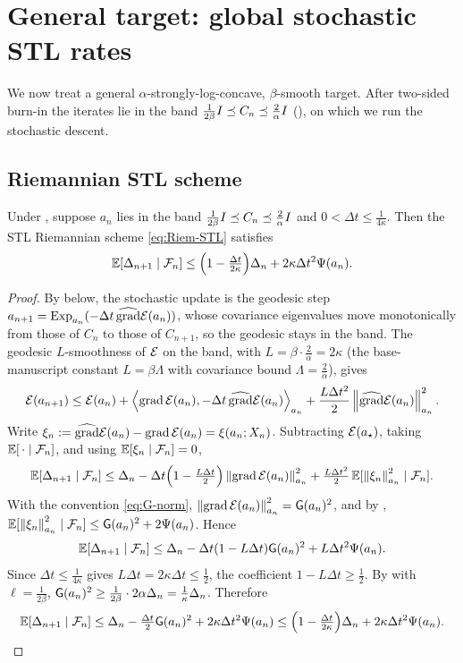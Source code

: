 \section{General target: global stochastic STL rates}

We now treat a general $\alpha$-strongly-log-concave, $\beta$-smooth target. After two-sided
burn-in the iterates lie in the band $\tfrac1{2\beta}I\preceq C_n\preceq\tfrac2\alpha I$
(), on which we run the stochastic descent.

\subsection{Riemannian STL scheme}

\begin{lemma}
\label{lem:Riem-STL-descent}
Under , suppose $a_n$ lies in the band
$\tfrac1{2\beta}I\preceq C_n\preceq\tfrac2\alpha I$ and
$0<\Delta t\leq\frac1{4\kappa}$.
Then the STL Riemannian scheme \eqref{eq:Riem-STL} satisfies
\[
    \mathbb{E}[\Delta_{n+1}\mid\mathcal{F}_n]
    \leq
    \Bigl(1-\tfrac{\Delta t}{2\kappa}\Bigr)\Delta_n
    +
    2\kappa\Delta t^2\Psi(a_n).
\]
\end{lemma}

\begin{proof}
By  below, the stochastic update is the geodesic step
$a_{n+1}=\operatorname{Exp}_{a_n}(-\Delta t\,\widehat{\operatorname{grad}}\mathcal{E}(a_n))$,
whose covariance eigenvalues move monotonically from those of $C_n$ to those of
$C_{n+1}$, so the geodesic stays in the band. The geodesic $L$-smoothness
of $\mathcal{E}$ on the band, with $L=\beta\cdot\tfrac2\alpha=2\kappa$ (the base-manuscript
constant $L=\beta\Lambda$ with covariance bound $\Lambda=\tfrac2\alpha$), gives
\[
    \mathcal{E}(a_{n+1})
    \leq
    \mathcal{E}(a_n)
    +
    \left\langle \operatorname{grad}\mathcal{E}(a_n),-\Delta t\,\widehat{\operatorname{grad}}\mathcal{E}(a_n)\right\rangle_{a_n}
    +
    \frac{L\Delta t^2}{2}\left\lVert \widehat{\operatorname{grad}}\mathcal{E}(a_n)\right\rVert_{a_n}^2 .
\]
Write $\xi_n:=\widehat{\operatorname{grad}}\mathcal{E}(a_n)-\operatorname{grad}\mathcal{E}(a_n)=\xi(a_n;X_n)$. Subtracting
$\mathcal{E}(a_\star)$, taking $\mathbb{E}[\,\cdot\mid\mathcal{F}_n]$, and using $\mathbb{E}[\xi_n\mid\mathcal{F}_n]=0$,
\[
    \mathbb{E}[\Delta_{n+1}\mid\mathcal{F}_n]
    \leq
    \Delta_n
    -
    \Delta t\Bigl(1-\tfrac{L\Delta t}2\Bigr)\left\lVert \operatorname{grad}\mathcal{E}(a_n)\right\rVert_{a_n}^2
    +
    \tfrac{L\Delta t^2}2\,\mathbb{E}[\left\lVert \xi_n\right\rVert_{a_n}^2\mid\mathcal{F}_n].
\]
With the convention \eqref{eq:G-norm}, $\left\lVert \operatorname{grad}\mathcal{E}(a_n)\right\rVert_{a_n}^2=\mathsf{G}(a_n)^2$,
and by , $\mathbb{E}[\left\lVert \xi_n\right\rVert_{a_n}^2\mid\mathcal{F}_n]\leq\mathsf{G}(a_n)^2+2\Psi(a_n)$.
Hence
\[
    \mathbb{E}[\Delta_{n+1}\mid\mathcal{F}_n]
    \leq
    \Delta_n
    -
    \Delta t(1-L\Delta t)\mathsf{G}(a_n)^2
    +
    L\Delta t^2\Psi(a_n).
\]
Since $\Delta t\leq\tfrac1{4\kappa}$ gives $L\Delta t=2\kappa\Delta t\leq\tfrac12$, the coefficient
$1-L\Delta t\geq\tfrac12$. By  with $\ell=\tfrac1{2\beta}$,
$\mathsf{G}(a_n)^2\geq\tfrac1{2\beta}\cdot2\alpha\Delta_n=\tfrac1\kappa\Delta_n$. Therefore
\[
    \mathbb{E}[\Delta_{n+1}\mid\mathcal{F}_n]
    \leq
    \Delta_n-\tfrac{\Delta t}2\mathsf{G}(a_n)^2+2\kappa\Delta t^2\Psi(a_n)
    \leq
    \Bigl(1-\tfrac{\Delta t}{2\kappa}\Bigr)\Delta_n+2\kappa\Delta t^2\Psi(a_n).
    \qedhere
\]
\end{proof}


